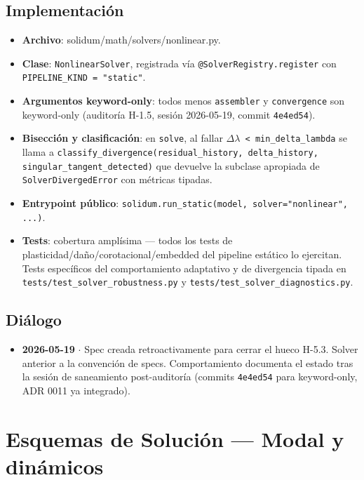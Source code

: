 \documentclass[11pt,letterpaper,oneside]{report}
\begin{document}
\section{Implementación}

\begin{itemize}
  \item \textbf{Archivo}: solidum/math/solvers/nonlinear.py.
  \item \textbf{Clase}: \texttt{NonlinearSolver}, registrada vía \texttt{@SolverRegistry.register} con \texttt{PIPELINE\_KIND = "static"}.
  \item \textbf{Argumentos keyword-only}: todos menos \texttt{assembler} y \texttt{convergence} son keyword-only (auditoría H-1.5, sesión 2026-05-19, commit \texttt{4e4ed54}).
  \item \textbf{Bisección y clasificación}: en \texttt{solve}, al fallar \texttt{\ensuremath{\Delta}\ensuremath{\lambda} < min\_delta\_lambda} se llama a \texttt{classify\_divergence(residual\_history, delta\_history, singular\_tangent\_detected)} que devuelve la subclase apropiada de \texttt{SolverDivergedError} con métricas tipadas.
  \item \textbf{Entrypoint público}: \texttt{solidum.run\_static(model, solver="nonlinear", ...)}.
  \item \textbf{Tests}: cobertura amplísima --- todos los tests de plasticidad/daño/corotacional/embedded del pipeline estático lo ejercitan. Tests específicos del comportamiento adaptativo y de divergencia tipada en \texttt{tests/test\_solver\_robustness.py} y \texttt{tests/test\_solver\_diagnostics.py}.
\end{itemize}


\section{Diálogo}

\begin{itemize}
  \item \textbf{2026-05-19} \ensuremath{\cdot} Spec creada retroactivamente para cerrar el hueco H-5.3. Solver anterior a la convención de specs. Comportamiento documenta el estado tras la sesión de saneamiento post-auditoría (commits \texttt{4e4ed54} para keyword-only, ADR 0011 ya integrado).
\end{itemize}


\newpage

\chapter{Esquemas de Solución — Modal y dinámicos}
\end{document}
